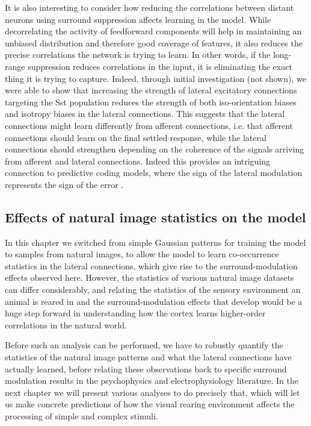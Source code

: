 It is also interesting to consider how reducing the
correlations between distant neurons using surround suppression
affects learning in the model. While decorrelating the activity of
feedforward components will help in maintaining an unbiased
distribution and therefore good coverage of features, it also reduces
the precise correlations the network is trying to learn. In other words, if the
long-range suppression reduces correlations in the input, it is
eliminating the exact thing it is trying to capture. Indeed, through
initial investigation (not shown), we were able to show that
increasing the strength of lateral excitatory connections targeting
the Sst population reduces the strength of both iso-orientation biases
and isotropy biases in the lateral connections. This suggests that the
lateral connections might learn differently from afferent connections,
i.e. that afferent connections should learn on the final settled
response, while the lateral connections should strengthen depending on
the coherence of the signals arriving from afferent and lateral
connections. Indeed this provides an intriguing connection to
predictive coding models, where the sign of the lateral modulation
represents the sign of the error \citep{Rao1999}.


\subsection{Effects of natural image statistics on the model}

In this chapter we switched from simple Gaussian patterns for training
the model to samples from natural images, to allow the model to learn
co-occurrence statistics in the lateral connections, which give rise
to the surround-modulation effects observed here. However, the
statistics of various natural image datasets can differ considerably,
and relating the statistics of the sensory environment an animal is
reared in and the surround-modulation effects that develop would be a
huge step forward in understanding how the cortex learns higher-order
correlations in the natural world.

Before such an analysis can be performed, we have to robustly quantify
the statistics of the natural image patterns and what the lateral
connections have actually learned, before relating these observations
back to specific surround modulation results in the psychophysics and
electrophysiology literature. In the next chapter we will present
various analyses to do precisely that, which will let us make concrete
predictions of how the visual rearing environment affects the
processing of simple and complex stimuli.

